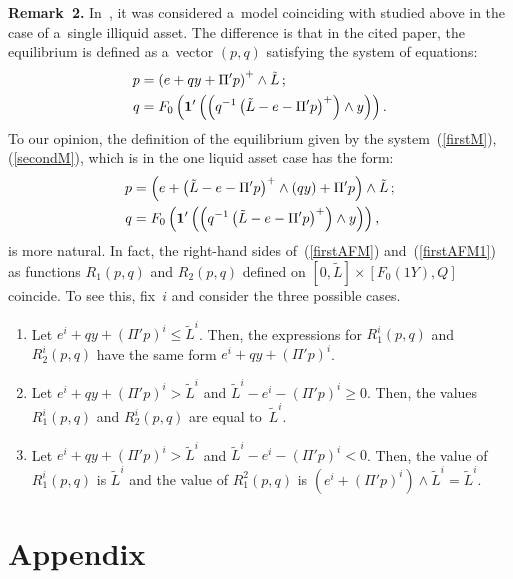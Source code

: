 \begin{multicols}{2}
\noindent
\textbf{Remark~2.}
In~\cite{AFM},  it was considered  a~model coinciding with studied 
above
in the case of a~single illiquid asset. The difference is that in the cited 
paper, the equilibrium is defined  as a~vector $(p,q)$ satisfying the
system of equations:
\begin{align}
\label{firstAFM}
p&=\left(e+qy+ \Pi'p\right)^+\wedge \tilde L\,; \\
q&=F_0\left({\bf 1}'\left(\left(q^{-1}
\left(\tilde L-e-\Pi'p\right)^+\right)\wedge y\right)\right).\notag
\end{align}
To our opinion, the definition of the equilibrium given 
by the system~(\ref{firstM}), 
(\ref{secondM}), which is in the one liquid asset case has the  form:
\begin{align}
p&=\left(e+\left(\tilde L-e-\Pi'p\right)^+\wedge (qy)+ 
\Pi'p\right)\wedge \tilde L\,; \label{firstAFM1}
\\
q&=F_0\left({\bf 1}'\left(\left(q^{-1}\left(\tilde L-e-\Pi'p\right)^+
\right)\wedge y\right)\right), \notag
\end{align}
 is more natural.  In fact, the   right-hand sides of~(\ref{firstAFM}) 
 and~(\ref{firstAFM1}) as functions $R_1(p,q)$ and $R_2(p,q)$ defined
 on $[0,\tilde L]\times [ F_0(1Y),Q]$ coincide.  To see this, fix~$i$ and  
consider the three possible cases.
\begin{enumerate}[1.]
\item  Let  $e^i+qy+ (\Pi'p)^i\le \tilde L^i$. Then, the expressions for 
$R^i_1(p,q)$ and $R^i_2(p,q)$ have the same form  $e^i+qy+ (\Pi'p)^i$.

\item Let $e^i+qy+ (\Pi'p)^i> \tilde L^i$ and $\tilde L^i-e^i - (\Pi'p)^i\ge 0$. 
Then, the values $R^i_1(p,q)$ and $R^i_2(p,q)$ are equal to~$\tilde L^i$.

\item Let $e^i+qy+ (\Pi'p)^i> \tilde L^i$ and $\tilde L^i-e^i - (\Pi'p)^i<0$. 
Then, the value of $R^i_1(p,q)$ is $\tilde L^i$ and the value of $R^2_1(p,q)$ is 
$(e^i + (\Pi'p)^i)\wedge \tilde L^i=\tilde L^i$.
\end{enumerate}

\vspace*{-18pt}


{\small
\section*{\raggedleft Appendix}

}
\end{multicols}
